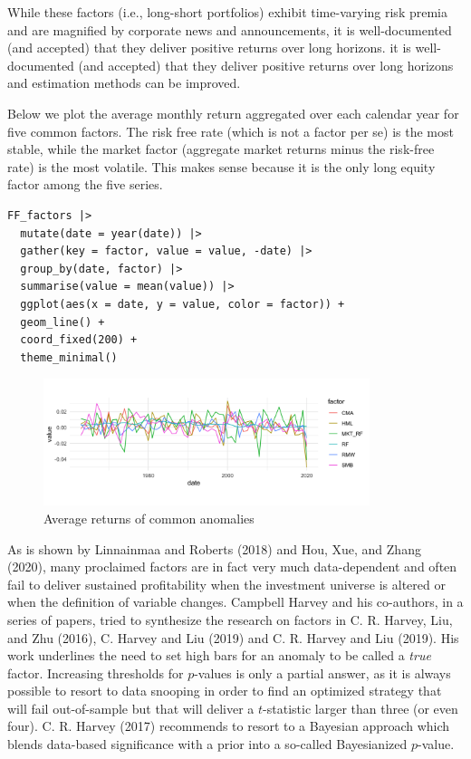 While these factors (i.e., long-short portfolios) exhibit time-varying risk premia and are magnified by corporate news and announcements, it is well-documented (and accepted) that they deliver positive returns over long horizons. it is well-documented (and accepted) that they deliver positive returns over long horizons and estimation methods can be improved.

Below we plot the average monthly return aggregated over each calendar year for five common factors. The risk free rate (which is not a factor per se) is the most stable, while the market factor (aggregate market returns minus the risk-free rate) is the most volatile. This makes sense because it is the only long equity factor among the five series.
\begin{lstlisting}
FF_factors |> 
  mutate(date = year(date)) |> 
  gather(key = factor, value = value, -date) |> 
  group_by(date, factor) |> 
  summarise(value = mean(value)) |> 
  ggplot(aes(x = date, y = value, color = factor)) + 
  geom_line() + 
  coord_fixed(200) + 
  theme_minimal()
\end{lstlisting}
\begin{figure}[H]
    \centering
    \caption{Average returns of common anomalies}
    \includegraphics[width=0.85\textwidth]{part_1/images/factor_vals.png}
\end{figure}

As is shown by Linnainmaa and Roberts (2018) and Hou, Xue, and Zhang (2020), many proclaimed factors are in fact very much data-dependent and often fail to deliver sustained profitability when the investment universe is altered or when the definition of variable changes. Campbell Harvey and his co-authors, in a series of papers, tried to synthesize the research on factors in C. R. Harvey, Liu, and Zhu (2016), C. Harvey and Liu (2019) and C. R. Harvey and Liu (2019). His work underlines the need to set high bars for an anomaly to be called a \textit{true} factor. Increasing thresholds for $p$-values is only a partial answer, as it is always possible to resort to data snooping in order to find an optimized strategy that will fail out-of-sample but that will deliver a $t$-statistic larger than three (or even four). C. R. Harvey (2017) recommends to resort to a Bayesian approach which blends data-based significance with a prior into a so-called Bayesianized $p$-value.

